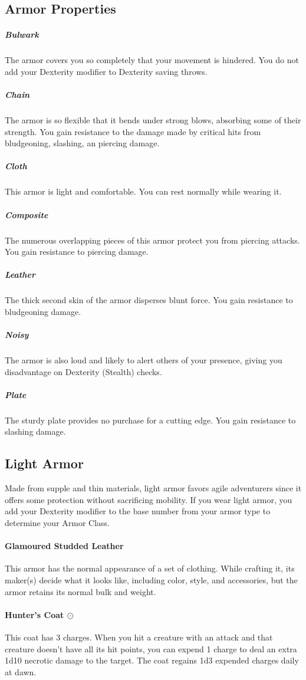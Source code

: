 \subsection*{Armor Properties} \label{ssec::armorproperties}
    \subparagraph{Bulwark}
        The armor covers you so completely that your movement is hindered.
        You do not add your Dexterity modifier to Dexterity saving throws.
    \subparagraph{Chain}
        The armor is so flexible that it bends under strong blows, absorbing some of their strength.
        You gain resistance to the damage made by critical hits from bludgeoning, slashing, an piercing damage.
    \subparagraph{Cloth}
        This armor is light and comfortable.
        You can rest normally while wearing it.
    \subparagraph{Composite}
        The numerous overlapping pieces of this armor protect you from piercing attacks.
        You gain resistance to piercing damage.
    \subparagraph{Leather}
        The thick second skin of the armor disperses blunt force.
        You gain resistance to bludgeoning damage.
    \subparagraph{Noisy}
        The armor is also loud and likely to alert others of your presence, giving you disadvantage on Dexterity (Stealth) checks.
    \subparagraph{Plate}
        The sturdy plate provides no purchase for a cutting edge.
        You gain resistance to slashing damage.
\subsection*{Light Armor} \label{ssec::lightarmor}
    Made from supple and thin materials, light armor favors agile adventurers since it offers some protection without sacrificing mobility.
    If you wear light armor, you add your Dexterity modifier to the base number from your armor type to determine your Armor Class.

    \paragraph{Glamoured Studded Leather}
        This armor has the normal appearance of a set of clothing.
        While crafting it, its maker(s) decide what it looks like, including color, style, and accessories, but the armor retains its normal bulk and weight.
    \paragraph{Hunter's Coat $\odot$}
        This coat has 3 charges.
        When you hit a creature with an attack and that creature doesn't have all its hit points, you can expend 1 charge to deal an extra 1d10 necrotic damage to the target.
        The coat regains 1d3 expended charges daily at dawn.

